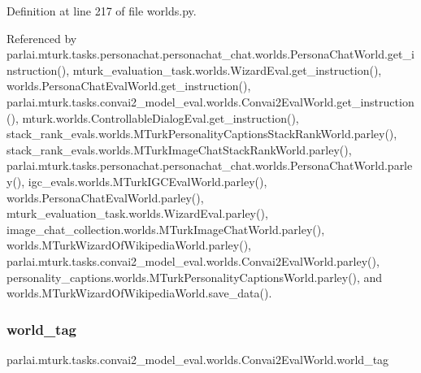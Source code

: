 Definition at line 217 of file worlds.\+py.



Referenced by parlai.\+mturk.\+tasks.\+personachat.\+personachat\+\_\+chat.\+worlds.\+Persona\+Chat\+World.\+get\+\_\+instruction(), mturk\+\_\+evaluation\+\_\+task.\+worlds.\+Wizard\+Eval.\+get\+\_\+instruction(), worlds.\+Persona\+Chat\+Eval\+World.\+get\+\_\+instruction(), parlai.\+mturk.\+tasks.\+convai2\+\_\+model\+\_\+eval.\+worlds.\+Convai2\+Eval\+World.\+get\+\_\+instruction(), mturk.\+worlds.\+Controllable\+Dialog\+Eval.\+get\+\_\+instruction(), stack\+\_\+rank\+\_\+evals.\+worlds.\+M\+Turk\+Personality\+Captions\+Stack\+Rank\+World.\+parley(), stack\+\_\+rank\+\_\+evals.\+worlds.\+M\+Turk\+Image\+Chat\+Stack\+Rank\+World.\+parley(), parlai.\+mturk.\+tasks.\+personachat.\+personachat\+\_\+chat.\+worlds.\+Persona\+Chat\+World.\+parley(), igc\+\_\+evals.\+worlds.\+M\+Turk\+I\+G\+C\+Eval\+World.\+parley(), worlds.\+Persona\+Chat\+Eval\+World.\+parley(), mturk\+\_\+evaluation\+\_\+task.\+worlds.\+Wizard\+Eval.\+parley(), image\+\_\+chat\+\_\+collection.\+worlds.\+M\+Turk\+Image\+Chat\+World.\+parley(), worlds.\+M\+Turk\+Wizard\+Of\+Wikipedia\+World.\+parley(), parlai.\+mturk.\+tasks.\+convai2\+\_\+model\+\_\+eval.\+worlds.\+Convai2\+Eval\+World.\+parley(), personality\+\_\+captions.\+worlds.\+M\+Turk\+Personality\+Captions\+World.\+parley(), and worlds.\+M\+Turk\+Wizard\+Of\+Wikipedia\+World.\+save\+\_\+data().

\mbox{\label{classparlai_1_1mturk_1_1tasks_1_1convai2__model__eval_1_1worlds_1_1Convai2EvalWorld_ac3c2c639d22166002b9a8ee1982f3f3f}} 
\subsubsection{\texorpdfstring{world\+\_\+tag}{world\_tag}}
{\footnotesize\ttfamily parlai.\+mturk.\+tasks.\+convai2\+\_\+model\+\_\+eval.\+worlds.\+Convai2\+Eval\+World.\+world\+\_\+tag}



